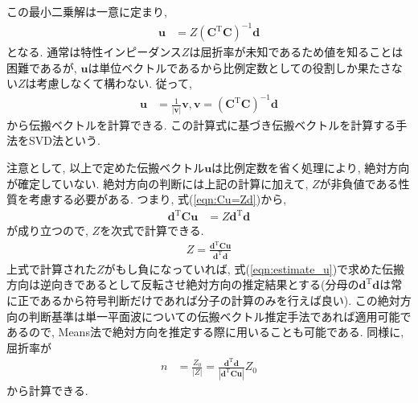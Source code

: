 \documentclass[a4j]{jsarticle}
\begin{document}
この最小二乗解は一意に定まり, 
\begin{align}
\bm{u}&=Z(\bm{C}^{\mathrm{T}}\bm{C})^{-1}\bm{d}
\end{align}
となる. 通常は特性インピーダンス$Z$は屈折率が未知であるため値を知ることは困難であるが, 
$\bm{u}$は単位ベクトルであるから比例定数としての役割しか果たさない$Z$は考慮しなくて構わない. 
従って, 
\begin{align}
\bm{u}&=\frac{1}{|\bm{v}|}\bm{v}, \bm{v}=(\bm{C}^{\mathrm{T}}\bm{C})^{-1}\bm{d}\label{eqn:estimate_u}
\end{align}
から伝搬ベクトルを計算できる. この計算式に基づき伝搬ベクトルを計算する手法をSVD法という. 

注意として, 以上で定めた伝搬ベクトル$\bm{u}$は比例定数を省く処理により, 絶対方向が確定していない. 
絶対方向の判断には上記の計算に加えて, $Z$が非負値である性質を考慮する必要がある. 
つまり, 式(\ref{eqn:Cu=Zd})から, 
\begin{align}
\bm{d}^{\mathrm{T}}\bm{C}\bm{u}&=Z\bm{d}^{\mathrm{T}}\bm{d}
\end{align}
が成り立つので, $Z$を次式で計算できる.  
\begin{align}
Z=\frac{\bm{d}^{\mathrm{T}}\bm{C}\bm{u}}{\bm{d}^{\mathrm{T}}\bm{d}}
\end{align}
上式で計算された$Z$がもし負になっていれば, 式(\ref{eqn:estimate_u})で求めた伝搬方向は逆向きであるとして反転させ絶対方向の推定結果とする(分母の$\bm{d}^{\mathrm{T}}\bm{d}$は常に正であるから符号判断だけであれば分子の計算のみを行えば良い). 
この絶対方向の判断基準は単一平面波についての伝搬ベクトル推定手法であれば適用可能であるので, Means法で絶対方向を推定する際に用いることも可能である. 
同様に, 屈折率が
\begin{align}
n&=\frac{Z_0}{|Z|}=\frac{\bm{d}^{\mathrm{T}}\bm{d}}{|\bm{d}^{\mathrm{T}}\bm{C}\bm{u}|}Z_0
\end{align}
から計算できる. 
\end{document}
